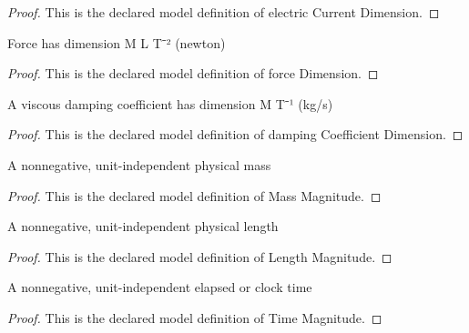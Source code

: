 \begin{proof}
  This is the declared model definition of electric Current Dimension.
\end{proof}
\begin{definition}
  \label{def:physics:phyx-mini-0979:phyxminiproblems-problemphyxmini0979-forcedimension}
  Force has dimension M L T⁻² (newton)
\end{definition}
\begin{proof}
  This is the declared model definition of force Dimension.
\end{proof}
\begin{definition}
  \label{def:physics:phyx-mini-0979:phyxminiproblems-problemphyxmini0979-dampingcoefficientdimension}
  A viscous damping coefficient has dimension M T⁻¹ (kg/s)
\end{definition}
\begin{proof}
  This is the declared model definition of damping Coefficient Dimension.
\end{proof}
\begin{definition}
  \label{def:physics:phyx-mini-0979:phyxminiproblems-problemphyxmini0979-massmagnitude}
  A nonnegative, unit-independent physical mass
\end{definition}
\begin{proof}
  This is the declared model definition of Mass Magnitude.
\end{proof}
\begin{definition}
  \label{def:physics:phyx-mini-0979:phyxminiproblems-problemphyxmini0979-lengthmagnitude}
  A nonnegative, unit-independent physical length
\end{definition}
\begin{proof}
  This is the declared model definition of Length Magnitude.
\end{proof}
\begin{definition}
  \label{def:physics:phyx-mini-0979:phyxminiproblems-problemphyxmini0979-timemagnitude}
  A nonnegative, unit-independent elapsed or clock time
\end{definition}
\begin{proof}
  This is the declared model definition of Time Magnitude.
\end{proof}
